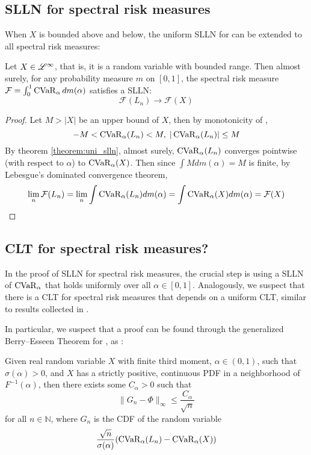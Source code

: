 \subsection{SLLN for spectral risk measures}
When $X$ is bounded above and below, the uniform SLLN for \cvar can be extended to all spectral risk measures:

\begin{theorem}
	\label{thm:uniform_slln_spec}
	Let $X\in \mathscr{L}^\infty$, that is, it is a random variable with bounded range. Then almost surely, for any probability measure $m$ on $[0, 1]$, the spectral risk measure $\mathcal{F} = \int_0^1 \operatorname{CVaR}_\alpha dm(\alpha)$ satisfies a SLLN:
	\begin{equation}
		\mathcal{F}(L_n)\to \mathcal{F}(X)
	\end{equation}
\end{theorem}
\begin{proof}
	Let $M > |X|$ be an upper bound of $X$, then by monotonicity of \cvar, 
	$$-M < \operatorname{CVaR}_\alpha(L_n) < M, \; |\operatorname{CVaR}_\alpha(L_n)| \le M $$
	By theorem \ref{theorem:uni_slln}, almost surely, $\operatorname{CVaR}_\alpha(L_n)$ converges pointwise (with respect to $\alpha$) to $\operatorname{CVaR}_\alpha(X)$. Then since $\int M dm(\alpha) = M$ is finite, by Lebesgue's dominated convergence theorem, 
	$$\lim_n\mathcal{F}(L_n) = \lim_n \int \operatorname{CVaR}_\alpha(L_n)dm(\alpha) =  \int \operatorname{CVaR}_\alpha(X)dm(\alpha) = \mathcal{F}(X)$$
\end{proof}

\subsection{CLT for spectral risk measures?}
In the proof of SLLN for spectral risk measures, the crucial step is using a SLLN of $\operatorname{CVaR}_\alpha$ that holds uniformly over all $\alpha\in[0, 1]$. Analogously, we suspect that there is a CLT for spectral risk measures that depends on a uniform CLT, similar to results collected in \cite{dudleyUniformCentralLimit1999}.

In particular, we suspect that a proof can be found through the generalized Berry--Esseen Theorem for \cvar, as \cite[Theorem 1.1]{gaoAsymptoticBehaviorEmpirical2011}:

\begin{theorem}
	Given real random variable $X$ with finite third moment, $\alpha \in (0, 1)$, such that $\sigma(\alpha) > 0$, and $X$ has a strictly positive, continuous PDF in a neighborhood of $F^{-1}(\alpha)$, then there exists some $C_\alpha > 0$ such that
	\begin{equation}
	\|G_n-\Phi\|_\infty \le \frac{C_\alpha}{\sqrt{n}}
	\end{equation} 
	for all $n \in \mathbb{N}$, where $G_n$ is the CDF of the random variable 
	$$\frac{\sqrt n}{\sigma(\alpha)}(\operatorname{CVaR}_\alpha(L_n) - \operatorname{CVaR}_\alpha(X))$$
\end{theorem}

